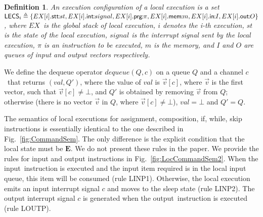 \documentclass[10pt,a4paper,oneside]{article}
\newtheorem{definition}{Definition}[section]
\def\dequeue#1#2{\ensuremath{dequeue(#1, #2)}}
\def\intsig#1{\ensuremath{#1}}
\def\st{\ensuremath{st}}
\def\sE{\textbf{E}}
\def\ST{{\ensuremath{EX}}}
\def\chnl{\ensuremath{c}}
\def\NIL{\ensuremath{\bot}}
\def\lcomma{\ensuremath{\!\!:\!\!}}
\def\lecconf#1#2#3{\ensuremath{\ST[#1].#2\lcomma#3}}
\def\valueM{\ensuremath{val}}
\def\comm{\ensuremath{\pi}}
\def\Iid{\ensuremath{I}}
\def\Oid{\ensuremath{O}}
\def\RINPUTYL{LINP1}
\def\RINPUTNL{LINP2}
\def\ROUTPUTL{LOUTP}
\def\NINPUT{input}
\def\NOUTPUT{output}
\def\lprog{{\sf prg}}
\def\lmem{{\sf mem}}
\def\linputi{{\sf in}}
\def\loutputi{{\sf out}}
\def\LECS{{\sf \ensuremath{LECS}}}
\def\LECSI{\ensuremath{\LECS_{i}}}
\def\litr{{\sf int}}
\def\lstate{{\sf stt}}
\begin{document}
\begin{definition}\label{def:execConf:lec}
An execution configuration of a local execution is a set $\LECSI \triangleq \{\lecconf{i}{\lstate}{\st},\lecconf{i}{\litr}{signal}, \lecconf{i}{\lprog}{\comm}, \lecconf{i}{\lmem}{m}, \lecconf{i}{\linputi}{\Iid}, \lecconf{i}{\loutputi}{\Oid}\}$, where \ST\ is the global stack of local execution, $i$ denotes the i-th execution, $\st$ is the state of the local execution, $signal$ is the interrupt signal sent by the local execution, $\comm$ is an instruction to be executed, $m$ is the memory, and $\Iid$ and $\Oid$ are queues of input and output vectors respectively.
\end{definition}

We define the dequeue operator \dequeue{Q}{\chnl} on a queue $Q$ and a channel \chnl\ that returns $(\valueM, Q')$, where the value of $\valueM$ is $\vec{v}[\chnl]$,  where $\vec{v}$ is the first vector, such that $\vec{v}[\chnl] \neq \NIL$, and $Q'$ is obtained by removing $\vec{v}$ from $Q$; otherwise (there is no vector $\vec{v}$ in $Q$, where $\vec{v}[\chnl] \neq \NIL$), $\valueM = \NIL$  and $Q' = Q$.


The semantics of local executions for assignment, composition, if, while, skip instructions is essentially identical to the one described in Fig.~\ref{fig:CommandSem}. The only difference is the explicit condition that the local state must be $\sE$. We do not present these rules in the paper. We provide the rules for input and output instructions in Fig.~\ref{fig:LocCommandSem2}. When the \NINPUT\ instruction is executed and the input item required is in the local input queue, this item will be consumed (rule \RINPUTYL). Otherwise, the local execution emits an input interrupt signal $\intsig{\chnl}$ and moves to the sleep state (rule \RINPUTNL).  The output interrupt signal $\intsig{\chnl}$ is generated when the \NOUTPUT\ instruction is executed (rule \ROUTPUTL).
\end{document}
